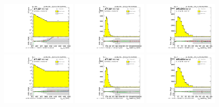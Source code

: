 \begin{figure}[htbp!]
\begin{center}
\includegraphics[width=0.32\textwidth,angle=-90]{figures/boosted/Reweight/Fits/Moriond_bkg_3_NoTag_4Trk_subl_Incl_leadHCand_Pt_m_1.pdf}
\includegraphics[width=0.32\textwidth,angle=-90]{figures/boosted/Reweight/Fits/Moriond_bkg_3_NoTag_4Trk_subl_Incl_leadHCand_trk0_Pt.pdf}
\includegraphics[width=0.32\textwidth,angle=-90]{figures/boosted/Reweight/Fits/Moriond_bkg_3_NoTag_4Trk_subl_Incl_leadHCand_trk1_Pt.pdf} \\
\includegraphics[width=0.32\textwidth,angle=-90]{figures/boosted/Reweight/Fits/Moriond_bkg_9_NoTag_4Trk_subl_Incl_leadHCand_Pt_m_1.pdf}
\includegraphics[width=0.32\textwidth,angle=-90]{figures/boosted/Reweight/Fits/Moriond_bkg_9_NoTag_4Trk_subl_Incl_leadHCand_trk0_Pt.pdf}
\includegraphics[width=0.32\textwidth,angle=-90]{figures/boosted/Reweight/Fits/Moriond_bkg_9_NoTag_4Trk_subl_Incl_leadHCand_trk1_Pt.pdf} \\

\end{center}
\end{figure}

